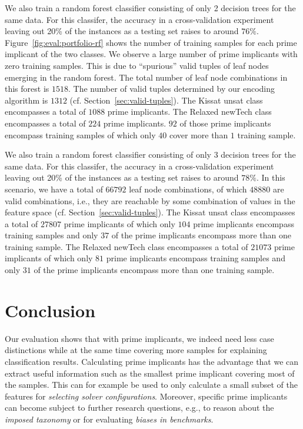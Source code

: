 \documentclass[a4paper, USenglish, cleveref, autoref, thm-restate]{lipics-v2021}
\theoremstyle{definition}
\begin{document}
We also train a random forest classifier consisting of only 2 decision trees for the same data. 
For this classifer, the accuracy in a cross-validation experiment leaving out 20\% of the instances as a testing set raises to around $76\%$. 
Figure~\ref{fig:eval:portfolio-rf} shows the number of training samples for each prime implicant of the two classes. 
We observe a large number of prime implicants with zero training samples. 
This is due to ``spurious'' valid tuples of leaf nodes emerging in the random forest. 
The total number of leaf node combinations in this forest is $1518$. 
The number of valid tuples determined by our encoding algorithm is $1312$ (cf. Section~\ref{sec:valid-tuples}). 
The \textsf{Kissat unsat} class encompasses a total of $1088$ prime implicants. 
The \textsf{Relaxed newTech} class encompasses a total of $224$ prime implicants. 
$92$ of those prime implicants encompass training samples of which only $40$ cover more than $1$ training sample. 

We also train a random forest classifier consisting of only 3 decision trees for the same data. 
For this classifer, the accuracy in a cross-validation experiment leaving out 20\% of the instances as a testing set raises to around $78\%$. 
In this scenario, we have a total of $66792$ leaf node combinations, of which $48880$ are valid combinations, i.e., they are reachable by some combination of values in the feature space (cf. Section~\ref{sec:valid-tuples}). 
The \textsf{Kissat unsat} class encompasses a total of $27807$ prime implicants of which only $104$ prime implicants encompass training samples and only $37$ of the prime implicants encompass more than one training sample. 
The \textsf{Relaxed newTech} class encompasses a total of $21073$ prime implicants of which only $81$ prime implicants encompass training samples and only $31$ of the prime implicants encompass more than one training sample. 

\section{Conclusion}
\label{sec:conclusion}

Our evaluation shows that with prime implicants, we indeed need less case distinctions while at the same time covering more samples for explaining classification results. 
Calculating prime implicants has the advantage that we can extract useful information such as the smallest prime implicant covering most of the samples. 
This can for example be used to only calculate a small subset of the features for \emph{selecting solver configurations}. 
Moreover, specific prime implicants can become subject to further research questions, e.g., to reason about the \emph{imposed taxonomy} or for evaluating \emph{biases in benchmarks}. 
\end{document}

